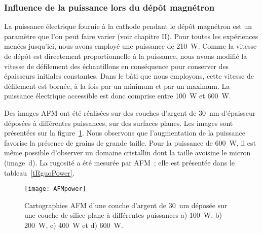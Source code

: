 	\subsubsection{Influence de la puissance lors du dépôt magnétron}
La puissance électrique fournie à la cathode pendant le dépôt magnétron est un paramètre que l'on peut faire varier (voir chapitre II). Pour toutes les expériences menées jusqu'ici, nous avons employé une puissance de 210~W. Comme la vitesse de dépôt est directement proportionnelle à la puissance, nous avons modifié la vitesse de défilement des échantillons en conséquence pour conserver des épaisseurs initiales constantes. Dans le bâti que nous employons, cette vitesse de défilement est bornée, à la fois par un minimum et par un maximum. La puissance électrique accessible est donc comprise entre 100~W et 600~W.\par 
Des images AFM ont été réalisées sur des couches d'argent de 30~nm d'épaisseur déposées à différentes puissances, sur des surfaces planes. Les images sont présentées sur la figure~\ref{AFMpower}. Nous observons que l'augmentation de la puissance favorise la présence de grains de grande taille. Pour la puissance de 600~W, il est même possible d'observer un domaine cristallin dont la taille avoisine le micron (image~d). La rugosité a été mesurée par AFM~; elle est présentée dans le tableau~\ref{tRguoPower}.\par 
\begin{figure}[!htb]
\centering
\texttt{[image: AFMpower]}
\caption{Cartographies AFM d'une couche d'argent de 30~nm déposée sur une couche de silice plane à différentes puissances a) 100~W, b) 200~W, c) 400~W et d) 600~W.}
\label{AFMpower}
\end{figure}

